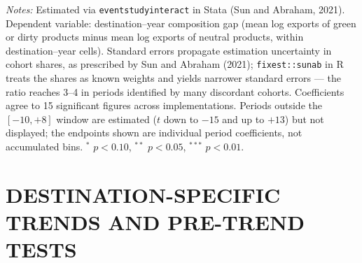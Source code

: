 \documentclass{article}
\begin{document}
\begin{table}[htbp]
\begin{threeparttable}
\begin{tablenotes}[flushleft]
\item \emph{Notes:} Estimated via \texttt{eventstudyinteract} in Stata (Sun and Abraham, 2021). Dependent variable: destination--year composition gap (mean log exports of green or dirty products minus mean log exports of neutral products, within destination--year cells). Standard errors propagate estimation uncertainty in cohort shares, as prescribed by Sun and Abraham (2021); \texttt{fixest::sunab} in R treats the shares as known weights and yields narrower standard errors --- the ratio reaches 3--4 in periods identified by many discordant cohorts. Coefficients agree to 15 significant figures across implementations. Periods outside the $[-10,+8]$ window are estimated ($t$ down to $-15$ and up to $+13$) but not displayed; the endpoints shown are individual period coefficients, not accumulated bins. $^{*}$ $p<0.10$, $^{**}$ $p<0.05$, $^{***}$ $p<0.01$.
\end{tablenotes}
\end{threeparttable}
\end{table}


\newpage
\section{DESTINATION-SPECIFIC TRENDS AND PRE-TREND TESTS}
\end{document}
